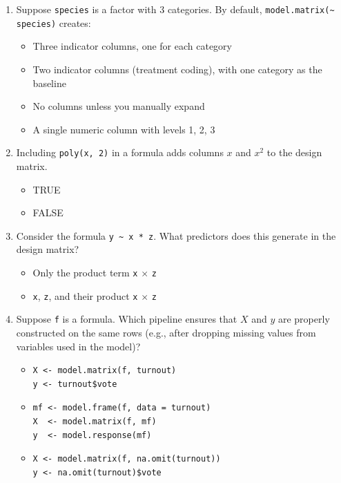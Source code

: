 \documentclass[12pt]{article}
\begin{document}
\begin{enumerate}[label=\textbf{\arabic*.}]
\item Suppose \verb|species| is a factor with 3 categories. By default, \verb|model.matrix(~ species)| creates:
\begin{itemize}
  \item[A.] Three indicator columns, one for each category
  \item[B.] Two indicator columns (treatment coding), with one category as the baseline %
  \item[C.] No columns unless you manually expand
  \item[D.] A single numeric column with levels 1, 2, 3
\end{itemize}

\item Including \verb|poly(x, 2)| in a formula adds columns \(x\) and \(x^2\) to the design matrix.
\begin{itemize}
  \item[A.] TRUE
  \item[B.] FALSE
\end{itemize}

\item Consider the formula \verb|y ~ x * z|. What predictors does this generate in the design matrix?
\begin{itemize}
  \item[A.] Only the product term \verb|x| $\times$ \verb|z|
  \item[B.] \verb|x|, \verb|z|, and their product \verb|x| $\times$ \verb|z|%
\end{itemize}

\item Suppose \verb|f| is a formula. Which pipeline ensures that \(X\) and \(y\) are properly constructed on the same rows (e.g., after dropping missing values from variables used in the model)?
\begin{itemize}

  \item[A.]
  \begin{verbatim}
X <- model.matrix(f, turnout)
y <- turnout$vote
  \end{verbatim}

  \item[B.]
  \begin{verbatim}
mf <- model.frame(f, data = turnout)
X  <- model.matrix(f, mf)
y  <- model.response(mf)
  \end{verbatim} %

  \item[C.]
  \begin{verbatim}
X <- model.matrix(f, na.omit(turnout))
y <- na.omit(turnout)$vote
  \end{verbatim}


\end{itemize}
\end{enumerate}
\end{document}
